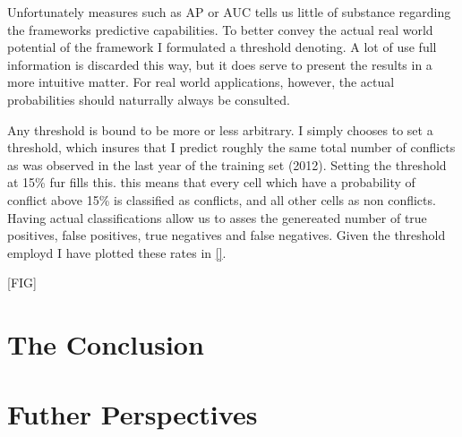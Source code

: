 \documentclass[a4paper]{article}
\begin{document}

Unfortunately measures such as AP or AUC tells us little of substance regarding the frameworks predictive capabilities. To better convey the actual real world potential of the framework I formulated a threshold denoting. A lot of use full information is discarded this way, but it does serve to present the results in a more intuitive matter. For real world applications, however, the actual probabilities should naturrally always be consulted.\par

Any threshold is bound to be more or less arbitrary. I simply chooses to set a threshold, which insures that I predict roughly the same total number of conflicts as was observed in the last year of the training set (2012). Setting the threshold at 15\% fur fills this. this means that every cell which have a probability of conflict above 15\% is classified as conflicts, and all other cells as non conflicts. Having actual classifications allow us to asses the genereated number of true positives, false positives, true negatives and false negatives. Given the threshold employd I have plotted these rates in \autoref{}.\par

[FIG]









\section{The Conclusion}

\section{Futher Perspectives}




\end{document}
